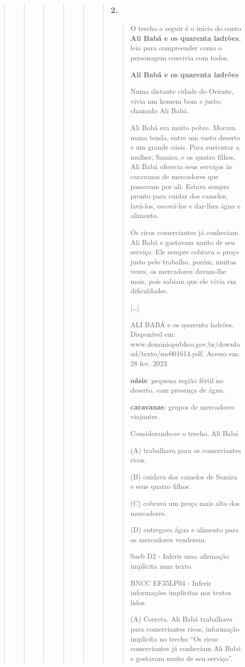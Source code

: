 \begin{quote}
\begin{quote}
\begin{quote}
\begin{quote}
\begin{quote}
\begin{quote}
\subsubsection{2. }\label{section-89}

\begin{quote}
O trecho a seguir é o início do conto \textbf{Ali Babá e os quarenta
ladrões}, leia para compreender como o personagem convivia com todos.

\textbf{Ali Babá e os quarenta ladrões}

Numa distante cidade do Oriente, vivia um homem bom e justo, chamado Ali
Babá.

Ali Babá era muito pobre. Morava numa tenda, entre um vasto deserto e um
grande oásis. Para sustentar a mulher, Samira, e os quatro filhos, Ali
Babá oferecia seus serviços às caravanas de mercadores que passavam por
ali. Estava sempre pronto para cuidar dos camelos, lavá-los, escová-los
e dar-lhes água e alimento.

Os ricos comerciantes já conheciam Ali Babá e gostavam muito de seu
serviço. Ele sempre cobrava o preço justo pelo trabalho, porém, muitas
vezes, os mercadores davam-lhe mais, pois sabiam que ele vivia em
dificuldades.

{[}\ldots{}{]}

ALI BABÁ e os quarenta ladrões. Disponível em:
www.dominiopublico.gov.br/download/texto/me001614.pdf. Acesso em: 28
fev. 2023.

\textbf{oásis}: pequena região fértil no deserto, com presença de água.

\textbf{caravanas}: grupos de mercadores viajantes.

Considerando-se o trecho, Ali Babá

\protect\hypertarget{_Hlk128465624}{}{}(A) trabalhava para os
comerciantes ricos.

(B) cuidava dos camelos de Samira e seus quatro filhos.

(C) cobrava um preço mais alto dos mercadores.

(D) entregava água e alimento para os mercadores venderem.

Saeb D2 - Inferir uma afirmação implícita num texto.

BNCC EF35LP04 - Inferir informações implícitas nos textos lidos.

(A) Correta. Ali Babá trabalhava para comerciantes ricos, informação
implícita no trecho ``Os ricos comerciantes já conheciam Ali Babá e
gostavam muito de seu serviço''.


\end{quote}
\end{quote}
\end{quote}
\end{quote}
\end{quote}
\end{quote}
\end{quote}
